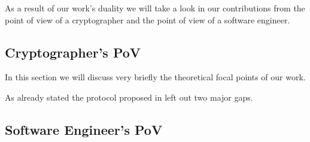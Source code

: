 As a result of our work's duality we will take a look in our contributions from the point of view of a cryptographer and the point of view of a software engineer.

\subsection{Cryptographer's PoV}

In this section we will discuss very briefly the theoretical focal points of our work.

As already stated the protocol proposed in \cite{mpotr} left out two major gaps.

\subsection{Software Engineer's PoV}
